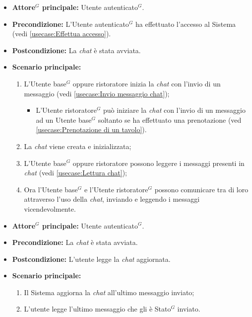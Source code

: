 \label{usecase:Comunicazione attraverso chat}
\begin{itemize}
	\item \textbf{\gls{Attore}$^G$ principale:} \gls{Utente autenticato}$^G$.

	\item \textbf{Precondizione:} L'\gls{Utente autenticato}$^G$ ha effettuato l'accesso al Sistema (vedi \autoref{usecase:Effettua accesso}).

	\item \textbf{Postcondizione:} La \textit{chat} è stata avviata.

	\item \textbf{Scenario principale:}
	      \begin{enumerate}
		      \item L'\gls{Utente base}$^G$ oppure ristoratore inizia la \textit{chat} con l'invio di un messaggio (vedi \autoref{usecase:Invio messaggio chat});
		            \begin{itemize}
			            \item L'\gls{Utente ristoratore}$^G$ può iniziare la \textit{chat} con l'invio di un messaggio ad un \gls{Utente base}$^G$ soltanto se ha effettuato una prenotazione (ved \autoref{usecase:Prenotazione di un tavolo}).
		            \end{itemize}
		      \item La \textit{chat} viene creata e inizializzata;
		      \item L'\gls{Utente base}$^G$ oppure ristoratore possono leggere i messaggi presenti in \textit{chat} (vedi \autoref{usecase:Lettura chat});
		      \item Ora l'\gls{Utente base}$^G$ e l'\gls{Utente ristoratore}$^G$ possono comunicare tra di loro attraverso l'uso della \textit{chat}, inviando e leggendo i messaggi vicendevolmente.
	      \end{enumerate}
\end{itemize}

\label{usecase:Lettura chat}
\begin{itemize}
	\item \textbf{\gls{Attore}$^G$ principale:} \gls{Utente autenticato}$^G$.

	\item \textbf{Precondizione:} La \textit{chat} è stata avviata.

	\item \textbf{Postcondizione:} L'utente legge la \textit{chat} aggiornata.

	\item \textbf{Scenario principale:}
	      \begin{enumerate}
		      \item Il Sistema aggiorna la \textit{chat} all'ultimo messaggio inviato;
		      \item L'utente legge l'ultimo messaggio che gli è \gls{Stato}$^G$ inviato.
	      \end{enumerate}
\end{itemize}



